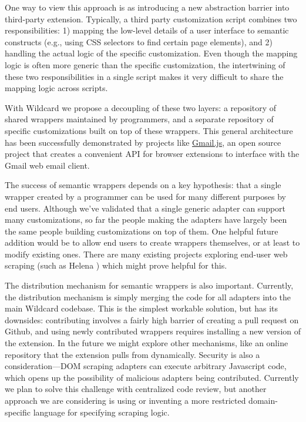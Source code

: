 \documentclass[sigplan,screen,10pt,anonymous,review]{acmart}
\begin{document}
One way to view this approach is as introducing a new abstraction
barrier into third-party extension. Typically, a third party
customization script combines two responsibilities: 1) mapping the
low-level details of a user interface to semantic constructs (e.g.,
using CSS selectors to find certain page elements), and 2) handling the
actual logic of the specific customization. Even though the mapping
logic is often more generic than the specific customization, the
intertwining of these two responsibilities in a single script makes it
very difficult to share the mapping logic across scripts.

With Wildcard we propose a decoupling of these two layers: a repository
of shared wrappers maintained by programmers, and a separate repository
of specific customizations built on top of these wrappers. This general
architecture has been successfully demonstrated by projects like
\href{https://github.com/KartikTalwar/gmail.js/}{Gmail.js}, an open
source project that creates a convenient API for browser extensions to
interface with the Gmail web email client.

The success of semantic wrappers depends on a key hypothesis: that a
single wrapper created by a programmer can be used for many different
purposes by end users. Although we've validated that a single generic
adapter can support many customizations, so far the people making the
adapters have largely been the same people building customizations on
top of them. One helpful future addition would be to allow end users to
create wrappers themselves, or at least to modify existing ones. There
are many existing projects exploring end-user web scraping (such as
Helena \citep{chasins2018}) which might prove helpful for this.

The distribution mechanism for semantic wrappers is also important.
Currently, the distribution mechanism is simply merging the code for all
adapters into the main Wildcard codebase. This is the simplest workable
solution, but has its downsides: contributing involves a fairly high
barrier of creating a pull request on Github, and using newly
contributed wrappers requires installing a new version of the extension.
In the future we might explore other mechanisms, like an online
repository that the extension pulls from dynamically. Security is also a
consideration---DOM scraping adapters can execute arbitrary Javascript
code, which opens up the possibility of malicious adapters being
contributed. Currently we plan to solve this challenge with centralized
code review, but another approach we are considering is using or
inventing a more restricted domain-specific language for specifying
scraping logic.
\end{document}
